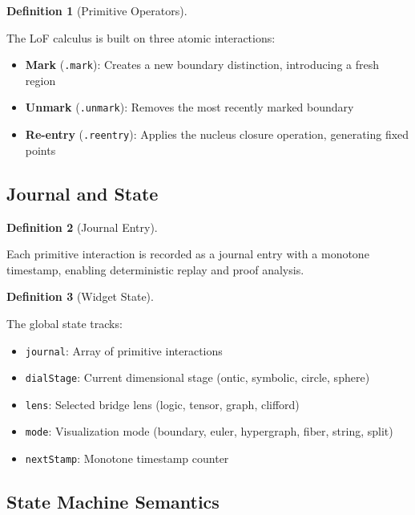 \documentclass{amsart}
\theoremstyle{definition}
\newtheorem{definition}{Definition}[section]
\theoremstyle{remark}
\begin{document}
\begin{definition}[Primitive Operators]
\label{def:primitives}
\uses{}

The LoF calculus is built on three atomic interactions:
\begin{itemize}
\item \textbf{Mark} (\texttt{.mark}): Creates a new boundary distinction, introducing a fresh region
\item \textbf{Unmark} (\texttt{.unmark}): Removes the most recently marked boundary
\item \textbf{Re-entry} (\texttt{.reentry}): Applies the nucleus closure operation, generating fixed points
\end{itemize}
\end{definition}

\subsection{Journal and State}
\label{sec:journal}

\begin{definition}[Journal Entry]
\label{def:journal-entry}

Each primitive interaction is recorded as a journal entry with a monotone timestamp, enabling deterministic replay and proof analysis.
\end{definition}

\begin{definition}[Widget State]
\label{def:state}

The global state tracks:
\begin{itemize}
\item \texttt{journal}: Array of primitive interactions
\item \texttt{dialStage}: Current dimensional stage (ontic, symbolic, circle, sphere)
\item \texttt{lens}: Selected bridge lens (logic, tensor, graph, clifford)
\item \texttt{mode}: Visualization mode (boundary, euler, hypergraph, fiber, string, split)
\item \texttt{nextStamp}: Monotone timestamp counter
\end{itemize}
\end{definition}

\subsection{State Machine Semantics}
\label{sec:stepper}
\end{document}
